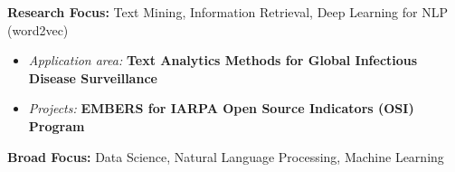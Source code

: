 \par{\textbf{Research Focus: } Text Mining, Information Retrieval, Deep Learning for NLP (word2vec)\vspace{0.5em}
\begin{itemize}
  \item \textit{Application area:} \textbf{Text Analytics Methods for Global Infectious Disease Surveillance}\\
  \item \textit{Projects:} \textbf{EMBERS for IARPA Open Source Indicators (OSI) Program}\\
\end{itemize}
        \textbf{Broad Focus:} Data Science, Natural Language Processing, Machine Learning\vspace{0.5em}
}
\vspace{1em}
